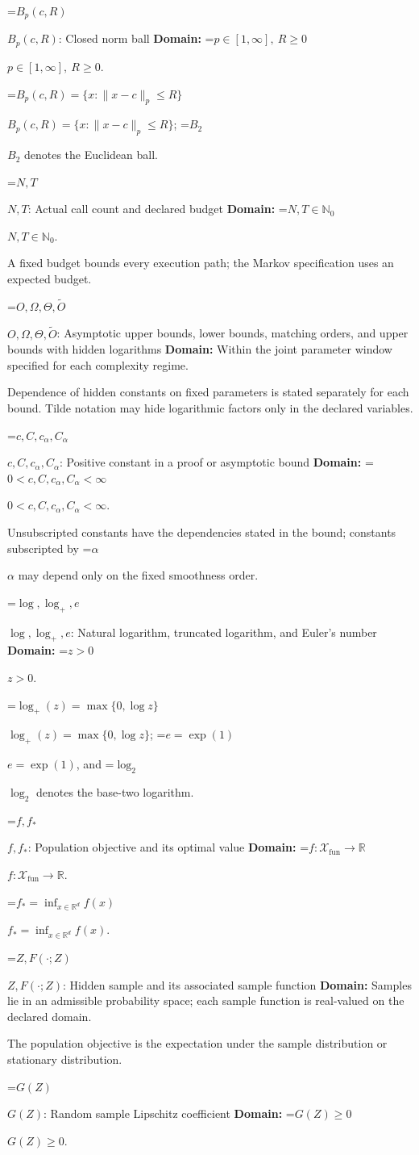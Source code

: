 \documentclass[10pt,a4paper]{article}
\newcommand{\AtlasMath}[1]{\par\begingroup\centering\setbox0=\hbox{$\displaystyle #1$}\ifdim\wd0>1.4\linewidth\typeout{ATLAS WIDE FORMULA: \the\wd0}\fi\ifdim\wd0>\linewidth\resizebox{\linewidth}{!}{\box0}\else\box0\fi\par\endgroup}
\newcommand{\AtlasInlineMath}[1]{\begingroup\setbox0=\hbox{$#1$}\ifdim\wd0>.4\linewidth\endgroup\AtlasMath{#1}\else\endgroup$#1$\fi}
\begin{document}
\AtlasInlineMath{B_p(c,R)}: Closed norm ball \textbf{Domain:} \AtlasInlineMath{p\in[1,\infty],\ R\ge0}.

\AtlasInlineMath{B_p(c,R)=\{x:\|x-c\|_p\le R\}}; \AtlasInlineMath{B_2} denotes the Euclidean ball.

\AtlasInlineMath{N,T}: Actual call count and declared budget \textbf{Domain:} \AtlasInlineMath{N,T\in\mathbb{N}_0}.

A fixed budget bounds every execution path; the Markov specification uses an expected budget.

\AtlasInlineMath{O,\Omega,\Theta,\widetilde{O}}: Asymptotic upper bounds, lower bounds, matching orders, and upper bounds with hidden logarithms \textbf{Domain:} Within the joint parameter window specified for each complexity regime.

Dependence of hidden constants on fixed parameters is stated separately for each bound. Tilde notation may hide logarithmic factors only in the declared variables.

\AtlasInlineMath{c,C,c_\alpha,C_\alpha}: Positive constant in a proof or asymptotic bound \textbf{Domain:} \AtlasInlineMath{0<c,C,c_\alpha,C_\alpha<\infty}.

Unsubscripted constants have the dependencies stated in the bound; constants subscripted by \AtlasInlineMath{\alpha} may depend only on the fixed smoothness order.

\AtlasInlineMath{\log,\log_+,e}: Natural logarithm, truncated logarithm, and Euler's number \textbf{Domain:} \AtlasInlineMath{z>0}.

\AtlasInlineMath{\log_+(z)=\max\{0,\log z\}}; \AtlasInlineMath{e=\exp(1)}, and \AtlasInlineMath{\log_2} denotes the base-two logarithm.

\AtlasInlineMath{f,f_*}: Population objective and its optimal value \textbf{Domain:} \AtlasInlineMath{f:\mathcal{X}_{\mathrm{fun}}\to\mathbb{R}}.

\AtlasInlineMath{f_*=\inf_{x\in \mathbb{R}^d}f(x)}.

\AtlasInlineMath{Z,F(\cdot;Z)}: Hidden sample and its associated sample function \textbf{Domain:} Samples lie in an admissible probability space; each sample function is real-valued on the declared domain.

The population objective is the expectation under the sample distribution or stationary distribution.

\AtlasInlineMath{G(Z)}: Random sample Lipschitz coefficient \textbf{Domain:} \AtlasInlineMath{G(Z)\ge0}.
\end{document}

